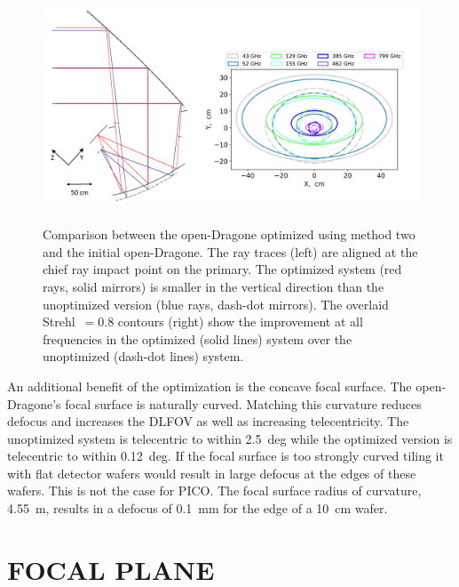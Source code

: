 \documentclass[]{spie}  %
\begin{document}
\begin{figure} [ht]
\begin{center}
\includegraphics[height=7cm]{jpl_vs_V3D.png}
\end{center}
\caption { \label{fig:compare} 
Comparison between the open-Dragone optimized using method two and the initial open-Dragone.  
The ray traces (left) are aligned at the chief ray impact point on the primary. 
The optimized system (red rays, solid mirrors) is smaller in the vertical direction than the unoptimized version 
(blue rays, dash-dot mirrors). The overlaid Strehl~$=0.8$ contours (right) show the improvement at 
all frequencies in the optimized (solid lines) system over the unoptimized (dash-dot lines) system. 
}
\end{figure} 

An additional benefit of the optimization is the concave focal surface. The open-Dragone's focal surface is naturally curved.  Matching this 
curvature reduces defocus and increases the DLFOV as well as increasing telecentricity.  The unoptimized system is telecentric to within 
2.5~deg while the optimized version is telecentric to within 0.12~deg. If the focal surface is too strongly curved tiling it with flat detector 
wafers would result in large defocus at the edges of these wafers.  This is not the case for PICO. The focal surface radius of curvature, 4.55~m, 
results in a defocus of 0.1~mm for the edge of a 10~cm wafer. 



\section{FOCAL PLANE}
\label{sec:focalplane}
\end{document}
